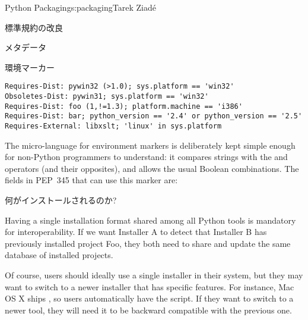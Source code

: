 \begin{aosachapter}{Python Packaging}{s:packaging}{Tarek Ziad\'{e}}
\begin{aosasect1}{標準規約の改良}
\begin{aosasect2}{メタデータ}
\begin{aosasect3}{環境マーカー}
\begin{verbatim}
Requires-Dist: pywin32 (>1.0); sys.platform == 'win32'
Obsoletes-Dist: pywin31; sys.platform == 'win32'
Requires-Dist: foo (1,!=1.3); platform.machine == 'i386'
Requires-Dist: bar; python_version == '2.4' or python_version == '2.5'
Requires-External: libxslt; 'linux' in sys.platform
\end{verbatim}

The micro-language for environment markers is deliberately kept simple
enough for non-Python programmers to understand: it compares strings
with the \code{==} and  operators (and their opposites), and
allows the usual Boolean combinations.  The fields in PEP~345 that can
use this marker are:

\begin{aosaitemize}
  \item {}
  \item {}
  \item {}
  \item {}
  \item {}
  \item {}
\end{aosaitemize}

\end{aosasect3}

\end{aosasect2}

\begin{aosasect2}{何がインストールされるのか?}

Having a single installation format shared among all Python tools is
mandatory for interoperability. If we want Installer A to detect that
Installer B has previously installed project Foo, they both need to
share and update the same database of installed projects.

Of course, users should ideally use a single installer in their
system, but they may want to switch to a newer installer that has
specific features. For instance, Mac OS X ships , so
users automatically have the  script. If they
want to switch to a newer tool, they will need it to be backward
compatible with the previous one.


\end{aosasect2}
\end{aosasect1}
\end{aosachapter}
